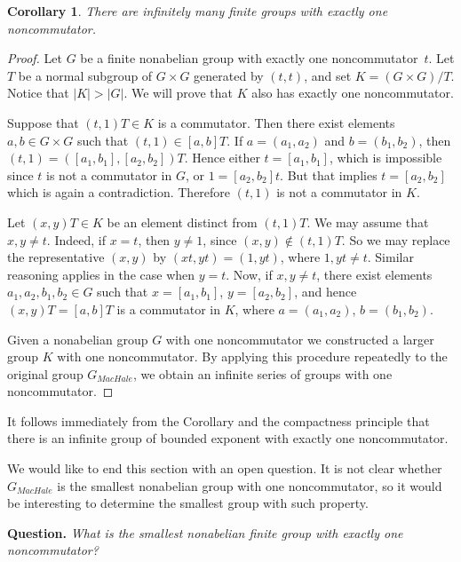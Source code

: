 \documentclass{article}
\newtheorem*{corollary}{Corollary}
\begin{document}
\begin{corollary}
	There are infinitely many finite groups with exactly one noncommutator.
\end{corollary}
\begin{proof}
	Let \( G \) be a finite nonabelian group with exactly one noncommutator~\( t \).
	Let \( T \) be a normal subgroup of \( G \times G \) generated by \( (t, t) \), and set \( K = (G \times G)/T \).
	Notice that \( |K| > |G| \). We will prove that \( K \) also has exactly one noncommutator.

	Suppose that \( (t, 1)T \in K \) is a commutator. Then there exist elements \( a, b \in G \times G \)
	such that \( (t, 1) \in [a, b]T \). If \( a = (a_1, a_2) \) and \( b = (b_1, b_2) \), then
	\( (t, 1) = ([a_1, b_1], [a_2, b_2])T \). Hence either \( t = [a_1, b_1] \), which is impossible since \( t \)
	is not a commutator in \( G \), or \( 1 = [a_2, b_2]t \). But that implies \( t = [a_2, b_2] \) which is again a contradiction.
	Therefore \( (t, 1) \) is not a commutator in \( K \).

	Let \( (x, y)T \in K \) be an element distinct from \( (t, 1)T \).
	We may assume that \( x, y \neq t \). Indeed, if \( x = t \), then \( y \neq 1 \), since \( (x, y) \not\in (t, 1)T \).
	So we may replace the representative \( (x, y) \) by \( (xt, yt) = (1, yt) \), where \( 1, yt \neq t \).
	Similar reasoning applies in the case when \( y = t \). Now, if \( x, y \neq t \), there exist elements \( a_1, a_2, b_1, b_2 \in G \)
	such that \( x = [a_1, b_1] \), \( y = [a_2, b_2] \), and hence \( (x, y)T = [a, b]T \) is a commutator in \( K \),
	where \( a = (a_1, a_2) \), \( b = (b_1, b_2) \).

	Given a nonabelian group \( G \) with one noncommutator we constructed a larger group \( K \) with one noncommutator.
	By applying this procedure repeatedly to the original group \( G_{MacHale} \), we obtain an infinite series of groups with one noncommutator.
\end{proof}

It follows immediately from the Corollary and the compactness principle that there is an infinite group of bounded exponent with exactly one noncommutator.

We would like to end this section with an open question.
It is not clear whether \( G_{MacHale} \) is the smallest nonabelian group with one noncommutator,
so it would be interesting to determine the smallest group with such property.
\medskip

\noindent
\textbf{Question.}
\emph{What is the smallest nonabelian finite group with exactly one noncommutator?}
\end{document}
